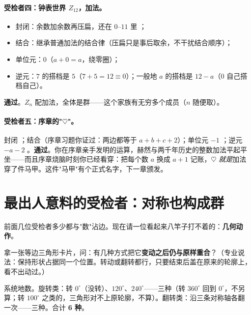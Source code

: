 \paragraph{受检者四：钟表世界 $Z_{12}$，加法。}
\begin{itemize}
\item 封闭：余数加余数再压扁，还在 $0$--$11$ 里 \checkmark；
\item 结合：继承普通加法的结合律（压扁只是事后取余，不干扰结合顺序）\checkmark；
\item 单位元：$0$（$a + 0 = a$，绕零圈）\checkmark；
\item 逆元：$7$ 的搭档是 $5$（$7+5 = 12\equiv 0$）；一般地 $a$ 的搭档是 $12-a$（$0$ 自己搭档自己）\checkmark。
\end{itemize}
\textbf{通过}。$Z_n$ 配加法，全体是群——这个家族有无穷多个成员（$n$ 随便取）。

\paragraph{受检者五：序章的"$\heartsuit$"。}
封闭 \checkmark；结合（序章习题你证过：两边都等于 $a+b+c+2$）\checkmark；单位元 $-1$ \checkmark；逆元 $-a-2$ \checkmark。\textbf{通过}。你在序章亲手发明的运算，赫然与两千年历史的整数加法平起平坐——而且序章烧脑时刻你已经看穿：把每个数 $a$ 换成 $a+1$ 记账，$\heartsuit$ \emph{就是}加法穿了件马甲。这件"马甲"有个正式名字，下一章颁发。

\section{最出人意料的受检者：对称也构成群}

前面几位受检者多少都与"数"沾边。现在请一位看起来八竿子打不着的：\textbf{几何动作}。

拿一张等边三角形卡片，问：有几种方式把它\textbf{变动之后仍与原样重合}？（专业说法：保持形状占据同一个位置。转动或翻转都行，只要结束后盖在原来的轮廓上，看不出动过。）

系统地数。旋转类：转 $0^\circ$（没转）、$120^\circ$、$240^\circ$——三种（转 $360^\circ$ 回到 $0^\circ$，不另算；转 $100^\circ$ 之类的，三角形对不上原轮廓，不算）。翻转类：沿三条对称轴各翻一次——三种。合计 \textbf{6 种}。

